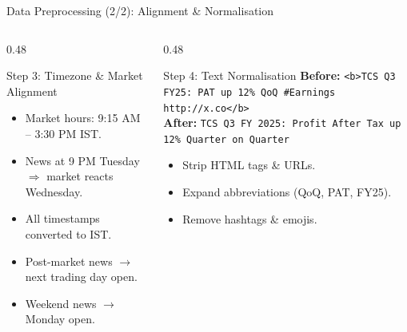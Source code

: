 \documentclass[aspectratio=169, 10pt]{beamer}
\begin{document}
\begin{frame}{Data Preprocessing (2/2): Alignment \& Normalisation}
    \begin{columns}[T]
        \begin{column}{0.48\textwidth}
            \begin{block}{Step 3: Timezone \& Market Alignment}
                \begin{itemize}
                    \item Market hours: 9:15 AM -- 3:30 PM IST.
                    \item News at 9 PM Tuesday $\Rightarrow$ market reacts Wednesday.
                    \item All timestamps converted to IST.
                    \item Post-market news $\rightarrow$ next trading day open.
                    \item Weekend news $\rightarrow$ Monday open.
                \end{itemize}
            \end{block}
        \end{column}
        \begin{column}{0.48\textwidth}
            \begin{block}{Step 4: Text Normalisation}
                \textbf{Before:} {\scriptsize \texttt{<b>TCS Q3 FY25: PAT up 12\% QoQ \#Earnings http://x.co</b>}}\\[4pt]
                \textbf{After:} {\scriptsize \texttt{TCS Q3 FY 2025: Profit After Tax up 12\% Quarter on Quarter}}\\[4pt]
                \begin{itemize}
                    \item Strip HTML tags \& URLs.
                    \item Expand abbreviations (QoQ, PAT, FY25).
                    \item Remove hashtags \& emojis.
                \end{itemize}
            \end{block}
        \end{column}
    \end{columns}
\end{frame}

\end{document}
